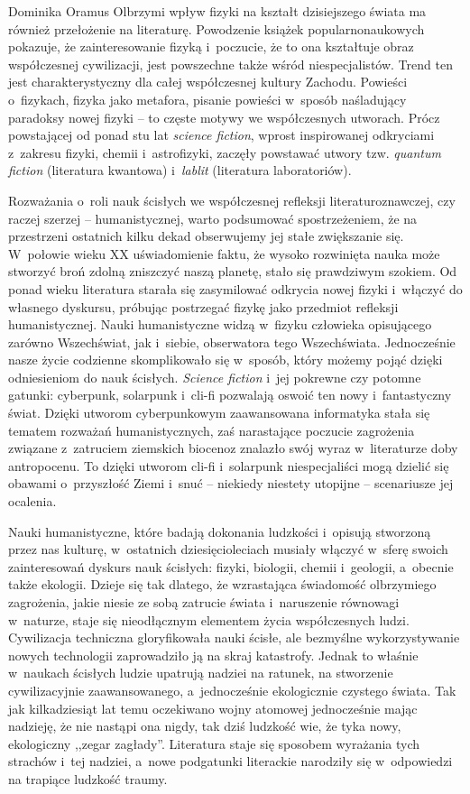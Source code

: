 \begin{artplenv}{Dominika Oramus}
Olbrzymi wpływ fizyki na kształt dzisiejszego świata ma również przełożenie na literaturę. Powodzenie książek popularnonaukowych pokazuje, że zainteresowanie fizyką i~poczucie, że to ona kształtuje obraz współczesnej cywilizacji, jest powszechne także wśród niespecjalistów. Trend ten jest charakterystyczny dla całej współczesnej kultury Zachodu. Powieści o~fizykach, fizyka jako metafora, pisanie powieści w~sposób naśladujący paradoksy nowej fizyki -- to częste motywy we współczesnych utworach. Prócz powstającej od ponad stu lat \textit{science fiction}, wprost inspirowanej odkryciami z~zakresu fizyki, chemii i~astrofizyki, zaczęły powstawać utwory tzw. \textit{quantum fiction} (literatura kwantowa) i~\textit{lablit} (literatura laboratoriów).

Rozważania o~roli nauk ścisłych we współczesnej refleksji literaturoznawczej, czy raczej szerzej -- humanistycznej, warto podsumować spostrzeżeniem, że na przestrzeni ostatnich kilku dekad obserwujemy jej stałe zwiększanie się. W~połowie wieku XX uświadomienie faktu, że wysoko rozwinięta nauka może stworzyć broń zdolną zniszczyć naszą planetę, stało się prawdziwym szokiem. Od ponad wieku literatura starała się zasymilować odkrycia nowej fizyki i~włączyć do własnego dyskursu, próbując postrzegać fizykę jako przedmiot refleksji humanistycznej. Nauki humanistyczne widzą w~fizyku człowieka opisującego zarówno Wszechświat, jak i~siebie, obserwatora tego Wszechświata. Jednocześnie nasze życie codzienne skomplikowało się w~sposób, który możemy pojąć dzięki odniesieniom do nauk ścisłych. \textit{Science fiction} i~jej pokrewne czy potomne gatunki: cyberpunk, solarpunk i~cli-fi pozwalają oswoić ten nowy i~fantastyczny świat. Dzięki utworom cyberpunkowym zaawansowana informatyka stała się tematem rozważań humanistycznych, zaś narastające poczucie zagrożenia związane z~zatruciem ziemskich biocenoz znalazło swój wyraz w~literaturze doby antropocenu. To dzięki utworom cli-fi i~solarpunk niespecjaliści mogą dzielić się obawami o~przyszłość Ziemi i~snuć -- niekiedy niestety utopijne -- scenariusze jej ocalenia.

Nauki humanistyczne, które badają dokonania ludzkości i~opisują stworzoną przez nas kulturę, w~ostatnich dziesięcioleciach musiały włączyć w~sferę swoich zainteresowań dyskurs nauk ścisłych: fizyki, biologii, chemii i~geologii, a~obecnie także ekologii. Dzieje się tak dlatego, że wzrastająca świadomość olbrzymiego zagrożenia, jakie niesie ze sobą zatrucie świata i~naruszenie równowagi w~naturze, staje się nieodłącznym elementem życia współczesnych ludzi. Cywilizacja techniczna gloryfikowała nauki ścisłe, ale bezmyślne wykorzystywanie nowych technologii zaprowadziło ją na skraj katastrofy. Jednak to właśnie w~naukach ścisłych ludzie upatrują nadziei na ratunek, na stworzenie cywilizacyjnie zaawansowanego, a~jednocześnie ekologicznie czystego świata. Tak jak kilkadziesiąt lat temu oczekiwano wojny atomowej jednocześnie mając nadzieję, że nie nastąpi ona nigdy, tak dziś ludzkość wie, że tyka nowy, ekologiczny ,,zegar zagłady''. Literatura staje się sposobem wyrażania tych strachów i~tej nadziei, a~nowe podgatunki literackie narodziły się w~odpowiedzi na trapiące ludzkość traumy.


\end{artplenv}
